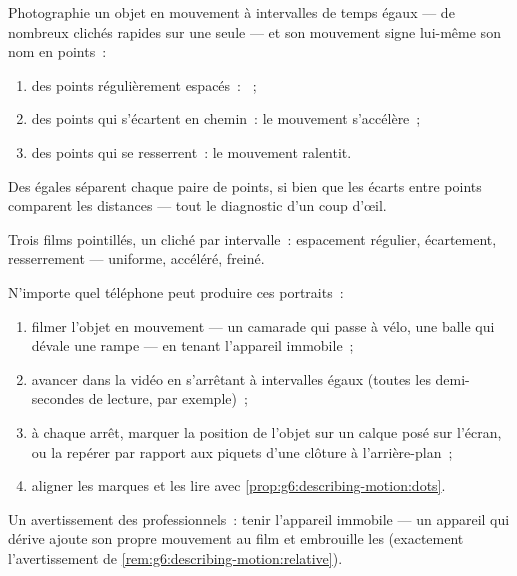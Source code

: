 \begin{proposition}\label{prop:g6:describing-motion:dots}
Photographie un objet en mouvement à intervalles de temps égaux ---
de nombreux clichés rapides sur une seule  --- et son mouvement
signe lui-même son nom en points~:
\begin{enumerate}
  \item des points régulièrement espacés~: ~;
  \item des points qui s'écartent en chemin~: le mouvement
        s'accélère~;
  \item des points qui se resserrent~: le mouvement ralentit.
\end{enumerate}
Des  égales séparent chaque paire de points, si bien que les
écarts entre points comparent les distances --- tout le diagnostic
d'un coup d'œil.
\end{proposition}

\begin{omfigure}

{\small Trois films pointillés, un cliché par intervalle~: espacement
régulier, écartement, resserrement --- uniforme, accéléré, freiné.}
\end{omfigure}

\begin{method}\label{met:g6:describing-motion:film}
N'importe quel téléphone peut produire ces portraits~:
\begin{enumerate}
  \item filmer l'objet en mouvement --- un camarade qui passe à
        vélo, une balle qui dévale une rampe --- en tenant l'appareil
        immobile~;
  \item avancer dans la vidéo en s'arrêtant à intervalles égaux
        (toutes les demi-secondes de lecture, par exemple)~;
  \item à chaque arrêt, marquer la position de l'objet sur un calque
        posé sur l'écran, ou la repérer par rapport aux piquets
        d'une clôture à l'arrière-plan~;
  \item aligner les marques et les lire avec
        \cref{prop:g6:describing-motion:dots}.
\end{enumerate}
Un avertissement des professionnels~: tenir l'appareil immobile ---
un appareil qui dérive ajoute son propre mouvement au film et
embrouille les  (exactement l'avertissement de
\cref{rem:g6:describing-motion:relative}).
\end{method}

